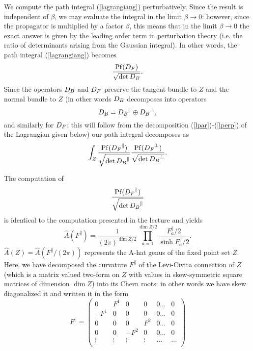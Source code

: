 \documentclass[12pt]{article}
\newcommand{\labell}[1] {\label{#1}}
\begin{document}
We compute the path integral (\ref{lagrangiang}) perturbatively.
Since the result is independent of $\beta$, we may evaluate the
integral in the limit $\beta \to 0$: however, since the propagator is
multiplied by a factor $\beta$, this means that in the 
limit $\beta \to 0 $ the exact answer is given by  the leading order
term in perturbation theory (i.e. the ratio 
of determinants arising from the Gaussian integral). 
In other words, the path integral (\ref{lagrangiang}) becomes  
\begin{equation} \label{pathintres}
\frac{ {\rm Pf}({D_F} )}{\sqrt{\det {D_B}} }. 
\end{equation}
Since the operators ${D_B}$ and ${D_F}$ preserve the tangent
bundle to $Z$ and the normal bundle to $Z$
(in other words ${D_B}$  decomposes into operators 
$${D_B} = 
{D_B}^\parallel \oplus {D_B}^\perp,$$ and 
similarly for ${D_F}$: this
will follow from the decomposition (\ref{lpar})-(\ref{lperp})
of the Lagrangian given below) 
 our path integral decomposes as 
$$\int_Z \frac{ {\rm Pf}({D_F}^\parallel )}{\sqrt{\det {D_B}^\parallel} }
\frac{ {\rm Pf}({D_F}^\perp )}{\sqrt{\det {D_B}^\perp} }. $$

The computation of 
$$\frac{ {\rm Pf}({D_F}^\parallel )}{\sqrt{\det {D_B}^\parallel} } $$
is identical to the computation presented in the lecture and yields
\begin{equation} \labell{intpar}
\hat{A}(F^\parallel) = \frac{1}{(2\pi)^{\dim Z/2}}
 \prod_{a= 1}^{\dim Z/2}  \frac{F^\parallel_a/2}{\sinh F^\parallel_a/2}.
\end{equation}
$\hat{A}(Z)=\hat{A}(F^\parallel/(2\pi))$ represents the A-hat genus 
of the fixed point set $Z$.
Here, we have decomposed the curvature $F^\parallel$ of the Levi-Civita
connection of $Z$ (which is a matrix valued two-form on $Z$ with values
in skew-symmetric  square matrices of dimension $\dim Z$)
into its Chern roots: in other words  we have skew diagonalized it and 
written it in the form
\begin{equation} \labell{diagcurv} F^{\parallel} = 
\left ( \begin{array}{lccccr} 
0 & F^1 & 0  & 0 & 0 \dots& 0   \\
 - F^1 & 0 & 0  & 0& 0 \dots & 0 \\
0& 0& 0  & F^2 & 0 \dots & 0\\ 
0& 0& -F^2  & 0 & 0 \dots & 0\\ 
\vdots& \vdots& \vdots & \vdots & \dots & \dots \\
\end{array} \right ) \end{equation}
\end{document}
